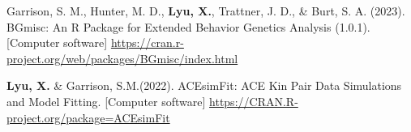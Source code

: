 
\begin{cvpublications}
  \cvpublication
    {Garrison, S. M., Hunter, M. D., \textbf{Lyu, X.}, Trattner, J. D., \& Burt, S. A. (2023). BGmisc: An R Package for Extended Behavior Genetics Analysis (1.0.1). [Computer software] \href{https://cran.r-project.org/web/packages/BGmisc/index.html}{https://cran.r-project.org/web/packages/BGmisc/index.html}}

  \cvpublication
    {\textbf{Lyu, X.} \& Garrison, S.M.(2022). ACEsimFit: ACE Kin Pair Data Simulations and Model Fitting. [Computer software] 
    \href{https://CRAN.R-project.org/package=ACEsimFit}{https://CRAN.R-project.org/package=ACEsimFit}} 
\end{cvpublications}
